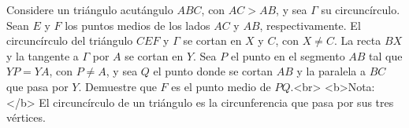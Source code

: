 Considere un triángulo acutángulo $ABC$, con $AC > AB$, y sea $\Gamma$ su circuncírculo. Sean $E$ y $F$ los puntos medios de los lados $AC$ y $AB$, respectivamente. El circuncírculo del triángulo $CEF$ y $\Gamma$ se cortan en $X$ y $C$, con $X \neq C$. La recta $BX$ y la tangente a $\Gamma$ por $A$ se cortan en $Y$. Sea $P$ el punto en el segmento $AB$ tal que$YP = YA$, con $P \neq A$, y sea $Q$ el punto donde se cortan $AB$ y la paralela a $BC$ que pasa por $Y$. Demuestre que $F$ es el punto medio de $PQ$.<br>
<b>Nota:</b> El circuncírculo de un triángulo es la circunferencia que pasa por sus tres vértices.
